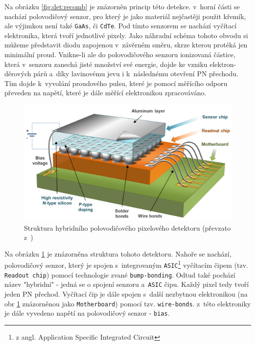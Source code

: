 Na obrázku \ref{fig:det:recomb} je znázorněn princip této detekce. v~horní části se nachází polovodičový senzor, pro který je jako materiál nejčastěji použit křemík, ale výjimkou není také \texttt{GaAs}, či \texttt{CdTe}. Pod tímto senzorem se nachází vyčítací elektronika, která tvoří jednotlivé pixely. Jako náhradní schéma tohoto obvodu si můžeme představit diodu zapojenou v~závěrném směru, skrze kterou protéká jen minimální proud. Vnikne-li ale do polovodičového senzoru ionizovaná částice, která v~senzoru zanechá jisté množství své energie, dojde ke vzniku elektron-děrových párů a~díky lavinovému jevu i k~následnému otevření PN přechodu. Tím dojde k~vyvolání proudového pulsu, které je pomocí měřícího odporu převeden na napětí, které je dále měřící elektronikou zpracováváno.

\begin{figure}[th]
	\begin{center}
		\includegraphics[width=12cm]{figures/det_chip.png}
		\caption{Struktura hybridního polovodičového pixelového detektoru (převzato z~\cite{PlatkevicDisertace})}
		\label{fig:det:chip}
	\end{center}
\end{figure}

Na obrázku \ref{fig:det:chip} je znázorněna struktura tohoto detektoru. Nahoře se nachází, polovodičový senzor, který je spojen s~integrovaným \texttt{ASIC}\footnote{z angl. Application Specific Integrated Circuit} vyčítacím čipem (tzv. \texttt{Readout chip}) pomocí technologie zvané \texttt{bump-bonding}. Odtud také pochází název "hybridní" - jedná se o spojení senzoru a~\texttt{ASIC} čipu. Každý pixel tedy tvoří jeden PN přechod. Vyčítací čip je dále spojen s~další nezbytnou elektronikou (na obr \ref{fig:det:chip} znázorněnou jako \texttt{Motherboard}) pomocí tzv. \texttt{wire-bonds}. z~této elektroniky je dále vyvedeno napětí na polovodičový senzor - \texttt{bias}.

